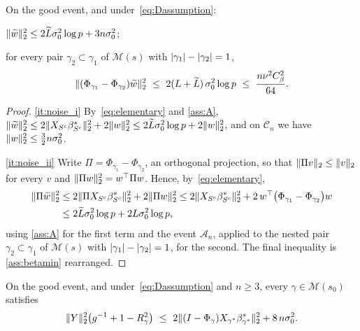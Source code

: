 \begin{lemma}
    \label{lemma:noise}
    On the good event, and under~\eqref{eq:Dassumption}:
    \begin{equivcond}
        \item\label{it:noise_i}
        $\lVert\widetilde w\rVert_2^{2}\leq2\widetilde{L}\sigma_0^{2}\log p
        +3n\sigma_0^{2}$;
        \item\label{it:noise_ii} for every pair
        $\gamma_2\subset\gamma_1$ of $\mathscr{M}(s)$ with
        $\lvert\gamma_1\rvert-\lvert\gamma_2\rvert=1$,
        \begin{equation*}
            \lVert(\Phi_{\gamma_1}-\Phi_{\gamma_2})\widetilde w\rVert_2^{2}
            \ \leq\ 2(L+\widetilde{L})\,\sigma_0^{2}\log p
            \ \leq\ \frac{n\nu^{2}C_\beta^{2}}{64} .
        \end{equation*}
    \end{equivcond}
\end{lemma}

\begin{proof}
    \ref{it:noise_i} By~\eqref{eq:elementary} and \cref{ass:A},
    $\lVert\widetilde w\rVert_2^{2}\leq2\lVert X_{S^{c}}
        \beta^\ast_{S^{c}}\rVert_2^{2}+2\lVert w\rVert_2^{2}
    \leq2\widetilde{L}\sigma_0^{2}\log p+2\lVert w\rVert_2^{2}$, and on $\mathcal{C}_n$
    we have $\lVert w\rVert_2^{2}\leq\tfrac32n\sigma_0^{2}$.

    \ref{it:noise_ii} Write $\Pi=\Phi_{\gamma_1}-\Phi_{\gamma_2}$, an
    orthogonal projection, so that $\lVert\Pi v\rVert_2\leq\lVert v\rVert_2$ for every
    $v$ and $\lVert\Pi w\rVert_2^{2}=w^{\top}\Pi w$. Hence,
    by~\eqref{eq:elementary},
    \begin{align*}
        \lVert\Pi\widetilde w\rVert_2^{2}
        &\leq2\lVert\Pi X_{S^{c}}\beta^\ast_{S^{c}}\rVert_2^{2}
        +2\lVert\Pi w\rVert_2^{2}
        \leq2\lVert X_{S^{c}}\beta^\ast_{S^{c}}\rVert_2^{2}
        +2\,w^{\top}\bigl(\Phi_{\gamma_1}-\Phi_{\gamma_2}\bigr)w\\
        &\leq2\widetilde{L}\sigma_0^{2}\log p+2L\sigma_0^{2}\log p,
    \end{align*}
    using \cref{ass:A} for the first term and the event $\mathcal{A}_n$,
    applied to the nested pair $\gamma_2\subset\gamma_1$ of
    $\mathscr{M}(s)$ with $\lvert\gamma_1\rvert-\lvert\gamma_2\rvert=1$, for the
    second. The final inequality is \cref{ass:betamin} rearranged.
\end{proof}

\begin{lemma}
    \label{lemma:Dupper}
    On the good event, and under~\eqref{eq:Dassumption} and $n\geq3$, every
    $\gamma\in\mathscr{M}(s_0)$ satisfies
    \begin{equation}
        \label{eq:Dupper}
        \lVert Y\rVert_2^{2}\bigl(g^{-1}+1-R^{2}_{\gamma}\bigr)
        \ \leq\ 2\lVert(I-\Phi_\gamma)X_{\gamma^{\ast}}\beta^{\ast}_{\gamma^{\ast}}\rVert_2^{2}
        +8\,n\sigma_0^{2} .
    \end{equation}
\end{lemma}

